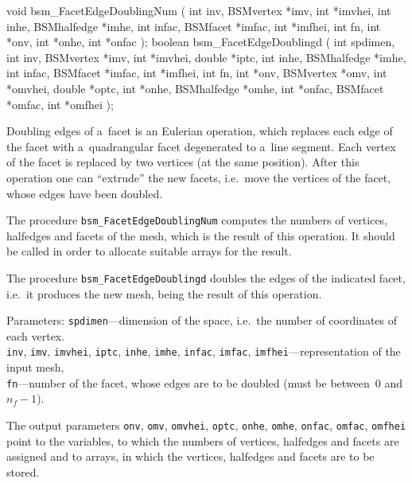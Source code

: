 \medskip
\begin{listingC}
void bsm_FacetEdgeDoublingNum ( int inv, BSMvertex *imv, int *imvhei,
                                int inhe, BSMhalfedge *imhe,
                                int infac, BSMfacet *imfac, int *imfhei,
                                int fn,
                                int *onv, int *onhe, int *onfac );
boolean bsm_FacetEdgeDoublingd ( int spdimen,
                 int inv, BSMvertex *imv, int *imvhei, double *iptc,
                 int inhe, BSMhalfedge *imhe,
                 int infac, BSMfacet *imfac, int *imfhei,
                 int fn,
                 int *onv, BSMvertex *omv, int *omvhei,
                 double *optc,
                 int *onhe, BSMhalfedge *omhe,
                 int *onfac, BSMfacet *omfac, int *omfhei );
\end{listingC}
Doubling edges of a~facet is an Eulerian operation, which replaces each edge
of the facet with a~quadrangular facet degenerated to a~line segment. Each
vertex of the facet is replaced by two vertices (at the same position).
After this operation one can ``extrude'' the new facets, i.e.\ move the
vertices of the facet, whose edges have been doubled.

The procedure \texttt{bsm\_FacetEdgeDoublingNum} computes the numbers of
vertices, halfedges and facets of the mesh, which is the result of this
operation. It should be called in order to allocate suitable arrays for the
result.

The procedure \texttt{bsm\_FacetEdgeDoublingd} doubles the edges of the
indicated facet, i.e.\ it produces the new mesh, being the result of this
operation.

Parameters: \texttt{spdimen}---dimension of the space, i.e.\ the number of
coordinates of each vertex. \\
\texttt{inv}, \texttt{imv}, \texttt{imvhei}, \texttt{iptc}, \texttt{inhe},
\texttt{imhe}, \texttt{infac}, \texttt{imfac},
\texttt{imfhei}---representation of the input mesh, \\
\texttt{fn}---number of the facet, whose edges are to be doubled
(must be between~$0$ and $n_f-1$).

The output parameters \texttt{onv}, \texttt{omv}, \texttt{omvhei},
\texttt{optc}, \texttt{onhe}, \texttt{omhe}, \texttt{onfac}, \texttt{omfac},
\texttt{omfhei} point to the variables, to which the numbers of vertices,
halfedges and facets are assigned and to arrays, in which the vertices,
halfedges and facets are to be stored.


